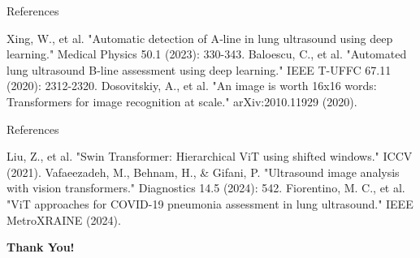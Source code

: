 \documentclass{beamer}
\begin{document}
\begin{frame}{References}
    \footnotesize
    \begin{thebibliography}{99}
         Xing, W., et al. "Automatic detection of A‐line in lung ultrasound using deep learning." Medical Physics 50.1 (2023): 330-343.
         Baloescu, C., et al. "Automated lung ultrasound B-line assessment using deep learning." IEEE T-UFFC 67.11 (2020): 2312-2320.
         Dosovitskiy, A., et al. "An image is worth 16x16 words: Transformers for image recognition at scale." arXiv:2010.11929 (2020).
    \end{thebibliography}

\end{frame}

\begin{frame}{References}
    \footnotesize
    \begin{thebibliography}{99}
         Liu, Z., et al. "Swin Transformer: Hierarchical ViT using shifted windows." ICCV (2021).
         Vafaeezadeh, M., Behnam, H., \& Gifani, P. "Ultrasound image analysis with vision transformers." Diagnostics 14.5 (2024): 542.
         Fiorentino, M. C., et al. "ViT approaches for COVID-19 pneumonia assessment in lung ultrasound." IEEE MetroXRAINE (2024).
    \end{thebibliography}
\end{frame}

\begin{frame}{}
    \centering
    \vspace{1cm}
    {\LARGE \textbf{Thank You!}} \\

\end{frame}
\end{document}
